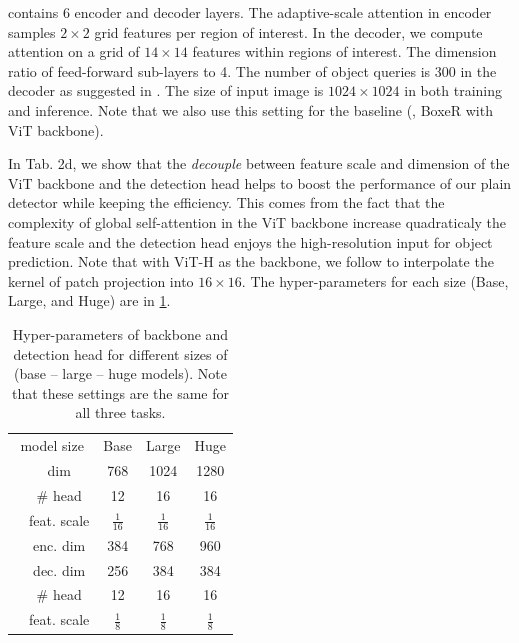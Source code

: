  \ours contains 6 encoder and decoder layers. The adaptive-scale attention in \ours encoder samples $2\times2$ grid features per region of interest. In the decoder, we compute attention on a grid of $14\times14$ features within regions of interest. The dimension ratio of feed-forward sub-layers to 4. The number of object queries is 300 in the decoder as suggested in \cite{nguyen2022boxer}. The size of input image is $1024\times1024$ in both training and inference. Note that we also use this setting for the baseline (\ie, BoxeR with ViT backbone).

In Tab. 2d, we show that the \emph{decouple} between feature scale and dimension of the ViT backbone and the detection head helps to boost the performance of our plain detector while keeping the efficiency. This comes from the fact that the complexity of global self-attention in the ViT backbone increase quadraticaly \wrt the feature scale and the detection head enjoys the high-resolution input for object prediction. Note that with ViT-H as the backbone, we follow \cite{li2022vitdet} to interpolate the kernel of patch projection into $16\times16$. The hyper-parameters for each \ours size (Base, Large, and Huge) are in \cref{tab:hyper}.

\begin{table}[h]
    \centering
    \footnotesize
    {
    \begin{tabular}{cc|ccc}
    \multicolumn{2}{c}{model size} & Base & Large & Huge \\
    \shline
    \multirow{3}{*}{backbone} & dim & 768 & 1024 & 1280 \\
     & \# head & 12 & 16 & 16 \\
     & feat. scale & $\frac{1}{16}$ & $\frac{1}{16}$ & $\frac{1}{16}$ \\
    \shline
    \multirow{3}{*}{detection head} & enc. dim & 384 & 768 & 960 \\
     & dec. dim & 256 & 384 & 384 \\
     & \# head & 12 & 16 & 16 \\
     & feat. scale & $\frac{1}{8}$ & $\frac{1}{8}$ & $\frac{1}{8}$ \\
    \end{tabular}
    }
    {\caption{Hyper-parameters of backbone and detection head for different sizes of \ours (base -- large -- huge models). Note that these settings are the same for all three tasks.}\label{tab:hyper}
    }%
\end{table}
